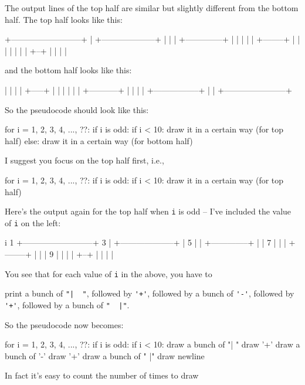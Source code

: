 The output lines of the top half are similar
but slightly different from the bottom half.
The top half looks like this:
{\small
\begin{console}[commandchars=\\\{\}]
+--------------------------+
|  +--------------------+  |
|  |  +--------------+  |  |
|  |  |  +--------+  |  |  |
|  |  |  |  +--+  |  |  |  |
\end{console}
}
and the bottom half looks like this:
{\small
\begin{console}[commandchars=\\\{\}]
|  |  |  |  +-----+  |  |  |
|  |  |  +-----------+  |  |
|  |  +-----------------+  |
|  +-----------------------+
\end{console}
}
So the pseudocode should look like this:
{\small
\begin{console}
for i = 1, 2, 3, 4, ..., ??:
    if i is odd:
        if i < 10: 
            draw it in a certain way (for top half)
        else:
            draw it in a certain way (for bottom half)
\end{console}
}
I suggest you focus on the top half first, i.e.,
{\small
\begin{console}
for i = 1, 2, 3, 4, ..., ??:
    if i is odd:
        if i < 10: 
            draw it in a certain way (for top half)
\end{console}
}
Here's the output again for the top half when \verb!i! is odd --
I've included the value of \verb!i! on the left:
{\small
\begin{console}
i
1  +--------------------------+
3  |  +--------------------+  |
5  |  |  +--------------+  |  |
7  |  |  |  +--------+  |  |  |
9  |  |  |  |  +--+  |  |  |  |
\end{console}
}
You see that for each value of \verb!i! in the above,
you have to
\begin{tightlist}
  \li print a bunch of \verb!"|  "!,
  \li followed by \verb!'+'!,
  \li followed by a bunch of \verb!'-'!,
  \li followed by \verb!'+'!,
  \li followed by a bunch of \verb!"  |"!.
\end{tightlist}
So the pseudocode now becomes:
{\small
\begin{console}
for i = 1, 2, 3, 4, ..., ??:
    if i is odd:
        if i < 10: 
            draw a bunch of "|  "
            draw '+'
            draw a bunch of '-'
            draw '+'
            draw a bunch of "  |"
            draw newline
\end{console}
}
In fact it's easy to count the number of times to draw

